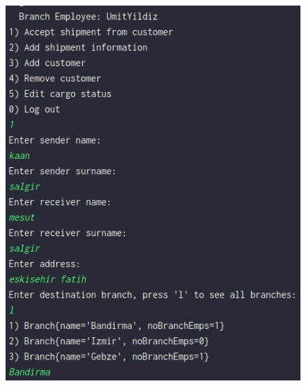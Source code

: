 \documentclass[a4paper]{article}
\begin{document}
\begin{Large}
\begin{center}
\begin{figure}[htp]
	\includegraphics[scale=0.6]{6-5}
\end{figure}

\end{center}
\end{Large}
\end{document}
